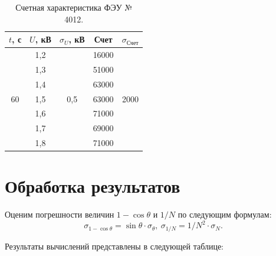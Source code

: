 \documentclass[a4paper,12pt]{article} %
\begin{document}
	
		\begin{table}[H]
			\caption{Счетная характеристика ФЭУ № 4012.}
			\label{table:schet}
			\begin{tabular}{|c|c|c|c|c|}
				\hline
				$t$, с              & $U$, кВ & $\sigma_U$, кВ       & Счет  & $\sigma_\text{Счет}$   \\ \hline
				\multirow{7}{*}{60} & 1,2     & \multirow{7}{*}{0,5} & 16000 & \multirow{7}{*}{2000} \\ \cline{2-2} \cline{4-4}
				& 1,3     &                      & 51000 &                       \\ \cline{2-2} \cline{4-4}
				& 1,4     &                      & 63000 &                       \\ \cline{2-2} \cline{4-4}
				& 1,5     &                      & 63000 &                       \\ \cline{2-2} \cline{4-4}
				& 1,6     &                      & 71000 &                       \\ \cline{2-2} \cline{4-4}
				& 1,7     &                      & 69000 &                       \\ \cline{2-2} \cline{4-4}
				& 1,8     &                      & 71000 &                       \\ \hline
			\end{tabular}
		\end{table}
	

		
	\newpage
	\section{Обработка результатов}
		Оценим погрешности величин $1 - \cos \theta$ и $1/N$ по следующим формулам:
		\begin{equation*}
			\sigma_{1-\cos \theta} = \sin \theta \cdot \sigma_\theta, \ \sigma_{1/N} = 1/N^2 \cdot \sigma_N.
		\end{equation*}
			
		Результаты вычислений представлены в следующей таблице:
			
\end{document}
